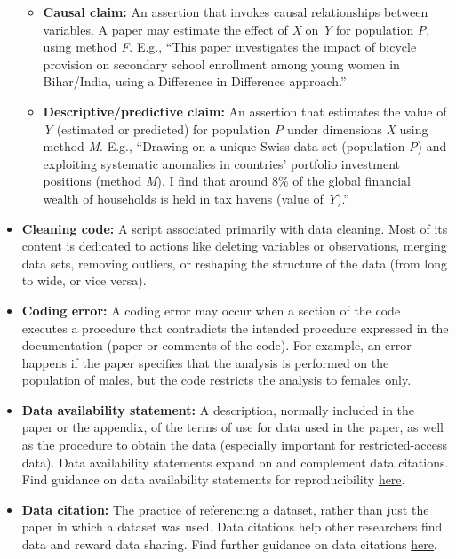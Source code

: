 \documentclass[
  openany]{book}
\providecommand{\tightlist}{%
  \setlength{\itemsep}{0pt}\setlength{\parskip}{0pt}}
\begin{document}
\begin{itemize}
  \begin{itemize}
  \tightlist
  \item
    \textbf{Causal claim:} An assertion that invokes causal relationships between variables. A paper may estimate the effect of \emph{X} on \emph{Y} for population \emph{P}, using method \emph{F}. E.g., ``This paper investigates the impact of bicycle provision on secondary school enrollment among young women in Bihar/India, using a Difference in Difference approach.''\\
  \item
    \textbf{Descriptive/predictive claim:} An assertion that estimates the value of \emph{Y} (estimated or predicted) for population \emph{P} under dimensions \emph{X} using method \emph{M}. E.g., ``Drawing on a unique Swiss data set (population \emph{P}) and exploiting systematic anomalies in countries' portfolio investment positions (method \emph{M}), I find that around 8\% of the global financial wealth of households is held in tax havens (value of \emph{Y}).''
  \end{itemize}
\item
  \textbf{Cleaning code:} A script associated primarily with data cleaning. Most of its content is dedicated to actions like deleting variables or observations, merging data sets, removing outliers, or reshaping the structure of the data (from long to wide, or vice versa).
\item
  \textbf{Coding error:} A coding error may occur when a section of the code executes a procedure that contradicts the intended procedure expressed in the documentation (paper or comments of the code). For example, an error happens if the paper specifies that the analysis is performed on the population of males, but the code restricts the analysis to females only.
\item
  \textbf{Data availability statement:} A description, normally included in the paper or the appendix, of the terms of use for data used in the paper, as well as the procedure to obtain the data (especially important for restricted-access data). Data availability statements expand on and complement data citations. Find guidance on data availability statements for reproducibility \href{https://social-science-data-editors.github.io/guidance/Requested_information_dcas.html\#what-are-data-and-code-availability-statements-dcas}{here}.
\item
  \textbf{Data citation:} The practice of referencing a dataset, rather than just the paper in which a dataset was used. Data citations help other researchers find data and reward data sharing. Find further guidance on data citations \href{https://social-science-data-editors.github.io/guidance/Data_citation_guidance.html}{here}.

\end{itemize}
\end{document}
